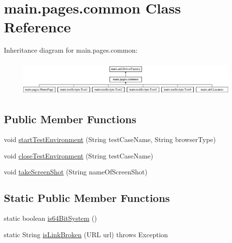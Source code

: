 \hypertarget{classmain_1_1pages_1_1common}{}\section{main.\+pages.\+common Class Reference}
\label{classmain_1_1pages_1_1common}
Inheritance diagram for main.\+pages.\+common\+:\begin{figure}[H]
\begin{center}
\leavevmode
\includegraphics[height=1.866667cm]{classmain_1_1pages_1_1common}
\end{center}
\end{figure}
\subsection*{Public Member Functions}
\begin{DoxyCompactItemize}
\item 
void \mbox{\hyperlink{classmain_1_1pages_1_1common_aedb8bb00674efe1e7b551e14d10219ba}{start\+Test\+Environment}} (String test\+Case\+Name, String browser\+Type)
\item 
void \mbox{\hyperlink{classmain_1_1pages_1_1common_a04df2281dc9f8ea63ba88528030c54c2}{close\+Test\+Environment}} (String test\+Case\+Name)
\item 
void \mbox{\hyperlink{classmain_1_1pages_1_1common_a7b9ae10e9d8cfb4504c06dc25d133c1f}{take\+Screen\+Shot}} (String name\+Of\+Screen\+Shot)
\end{DoxyCompactItemize}
\subsection*{Static Public Member Functions}
\begin{DoxyCompactItemize}
\item 
static boolean \mbox{\hyperlink{classmain_1_1pages_1_1common_aa1116271e95e4d544eab6c38d160a1ab}{is64\+Bit\+System}} ()
\item 
static String \mbox{\hyperlink{classmain_1_1pages_1_1common_a75bf8538e39f1ea3759eebeef9edfa22}{is\+Link\+Broken}} (U\+RL url)  throws Exception 	 
\end{DoxyCompactItemize}
